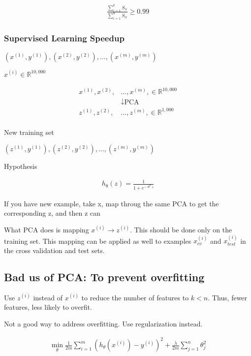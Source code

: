 \begin{align*}
\frac
{\sum_{i=1}^k S_{ii}}
{\sum_{i=1}^n S_{ii}}
\geq 0.99
\end{align*}

\hypertarget{supervised-learning-speedup}{%
\subsubsection{Supervised Learning
Speedup}\label{supervised-learning-speedup}}

\((x^{(1)},y^{(1)}),(x^{(2)},y^{(2)}),\dots,(x^{(m)},y^{(m)})\)

\(x^{(i)}\in\mathbb{R}^{10,000}\)

\begin{align*}
x^{(1)}, x^{(2)},& \dots, x^{(m)}, \in\mathbb{R}^{10,000}\\
&\downarrow \text{PCA}\\
z^{(1)}, z^{(2)},& \dots, z^{(m)}, \in\mathbb{R}^{1,000}\\
\end{align*}

New training set

\((z^{(1)},y^{(1)}),(z^{(2)},y^{(2)}),\dots,(z^{(m)},y^{(m)})\)

Hypothesis

\begin{align*}
h_{\uptheta}(z) = \frac{1}{1+e^{-\uptheta^{T}z}}
\end{align*}

If you have new example, take x, map throug the same PCA to get the
corresponding z, and then z can

What PCA does is mapping \(x^{(i)} \rightarrow z^{(i)}\). This should be
done only on the training set. This mapping can be applied as well to
examples \(x^{(i)}_{cv}\) and \(x^{(i)}_{test}\) in the cross validation
and test sets.

\hypertarget{bad-us-of-pca-to-prevent-overfitting}{%
\subsection{Bad us of PCA: To prevent
overfitting}\label{bad-us-of-pca-to-prevent-overfitting}}

Use \(z^{(i)}\) instead of \(x^{(i)}\) to reduce the number of features
to \(k<n\). Thus, fewer features, less likely to overfit.

Not a good way to address overfitting. Use regularization instead.

\begin{align*}
\min_{\theta} \frac{1}{2m} \sum^{m}_{i=1}(h_{\theta}(x^{(i)}) - y^{(i)})^2 + \frac{\lambda}{2m}\sum^{n}_{j=1}\theta^2_j
\end{align*}

